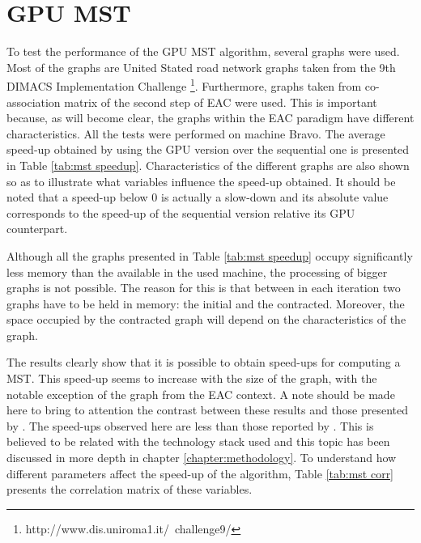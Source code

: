 \section{GPU MST}
\label{sec:gpu mst}


To test the performance of the GPU MST algorithm, several graphs were used.
Most of the graphs are United Stated road network graphs taken from the 9th DIMACS Implementation Challenge \footnote{http://www.dis.uniroma1.it/~challenge9/}.
Furthermore, graphs taken from co-association matrix of the second step of EAC were used.
This is important because, as will become clear, the graphs within the EAC paradigm have different characteristics.
All the tests were performed on machine Bravo.
The average speed-up obtained by using the GPU version over the sequential one is presented in Table \ref{tab:mst speedup}.
Characteristics of the different graphs are also shown so as to illustrate what variables influence the speed-up obtained.
It should be noted that a speed-up below 0 is actually a slow-down and its absolute value corresponds to the speed-up of the sequential version relative its GPU counterpart.



Although all the graphs presented in Table \ref{tab:mst speedup} occupy significantly less memory than the available in the used machine, the processing of bigger graphs is not possible.
The reason for this is that between in each iteration two graphs have to be held in memory: the initial and the contracted.
Moreover, the space occupied by the contracted graph will depend on the characteristics of the graph.

The results clearly show that it is possible to obtain speed-ups for computing a MST.
This speed-up seems to increase with the size of the graph, with the notable exception of the graph from the EAC context.
A note should be made here to bring to attention the contrast between these results and those presented by \citet{Sousa2015}.
The speed-ups observed here are less than those reported by \citet{Sousa2015}.
This is believed to be related with the technology stack used and this topic has been discussed in more depth in chapter \ref{chapter:methodology}.
To understand how different parameters affect the speed-up of the algorithm, Table \ref{tab:mst corr} presents the correlation matrix of these variables.

